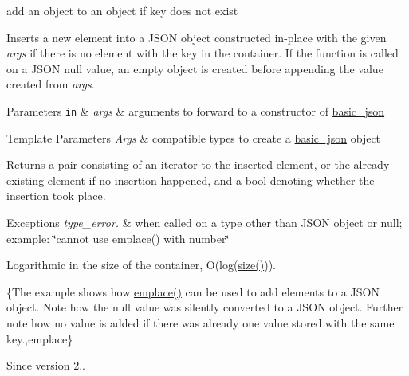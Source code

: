add an object to an object if key does not exist 

Inserts a new element into a J\+S\+ON object constructed in-\/place with the given {\itshape args} if there is no element with the key in the container. If the function is called on a J\+S\+ON null value, an empty object is created before appending the value created from {\itshape args}.


\begin{DoxyParams}[1]{Parameters}
\mbox{\tt in}  & {\em args} & arguments to forward to a constructor of \hyperlink{classnlohmann_1_1basic__json}{basic\+\_\+json} \\
\hline
\end{DoxyParams}

\begin{DoxyTemplParams}{Template Parameters}
{\em Args} & compatible types to create a \hyperlink{classnlohmann_1_1basic__json}{basic\+\_\+json} object\\
\hline
\end{DoxyTemplParams}
\begin{DoxyReturn}{Returns}
a pair consisting of an iterator to the inserted element, or the already-\/existing element if no insertion happened, and a bool denoting whether the insertion took place.
\end{DoxyReturn}

\begin{DoxyExceptions}{Exceptions}
{\em type\+\_\+error.} & when called on a type other than J\+S\+ON object or null; example\+: {\ttfamily \char`\"{}cannot use emplace() with number\char`\"{}}\\
\hline
\end{DoxyExceptions}
Logarithmic in the size of the container, O(log({\ttfamily \hyperlink{classnlohmann_1_1basic__json_a33c7c8638bb0b12e6d1b69d8106dd2e0}{size()}})).

\{The example shows how {\ttfamily \hyperlink{classnlohmann_1_1basic__json_ab8250fc95e669ecb5358b87d3b8c7976}{emplace()}} can be used to add elements to a J\+S\+ON object. Note how the {\ttfamily null} value was silently converted to a J\+S\+ON object. Further note how no value is added if there was already one value stored with the same key.,emplace\}

\begin{DoxySince}{Since}
version 2.. 
\end{DoxySince}
